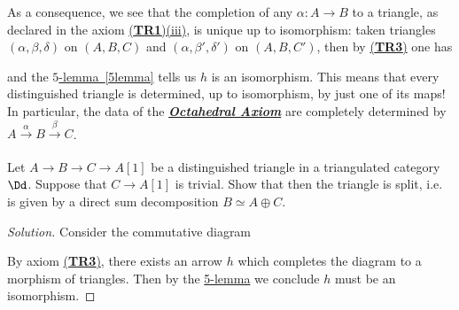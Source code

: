 \begin{rmk}
    As a consequence, we see that the completion 
    of any $\alpha: A \to B$ to a triangle,
    as declared in the axiom \hyperref[TR1]{(\textbf{TR1})(iii)},
    is unique up to isomorphism: taken triangles
    $(\alpha,\beta,\delta)$ on $(A,B,C)$ and
    $(\alpha,\beta',\delta')$ on $(A,B,C')$,
    then by \hyperref[TR3]{(\textbf{TR3})} one has
    \begin{center}
        \end{center}
    and the \hyperref[5lemma]{$5$-lemma~\ref*{5lemma}} tells us $h$ is an isomorphism.
    This means that every distinguished triangle is determined,
    up to isomorphism, by just one of its maps! In particular,
    the data of the \hyperref[TR4]{\emph{\textbf{Octahedral Axiom}}}
    are completely determined by $A \xrightarrow[]{\alpha} B \xrightarrow[]{\beta} C$.
\end{rmk}

\begin{exercise!}\label{split-lemma}
    Let $A \to B \to C \to A[1]$ be a distinguished triangle 
    in a triangulated category $\Dd$. 
    Suppose that $C \to A[1]$ is trivial. 
    Show that then the triangle is split, 
    i.e. is given by a direct sum 
    decomposition $B \simeq A \oplus C$.
    \begin{proof}[Solution]
        Consider the commutative diagram
        \begin{center}
        \end{center}
        By axiom \hyperref[TR3]{(\textbf{TR3})},
        there exists an arrow $h$ which completes
        the diagram to a morphism of triangles.
        Then by the \hyperref[5lemma]{5-lemma}
        we conclude $h$ must be an isomorphism.
    \end{proof}
\end{exercise!}

